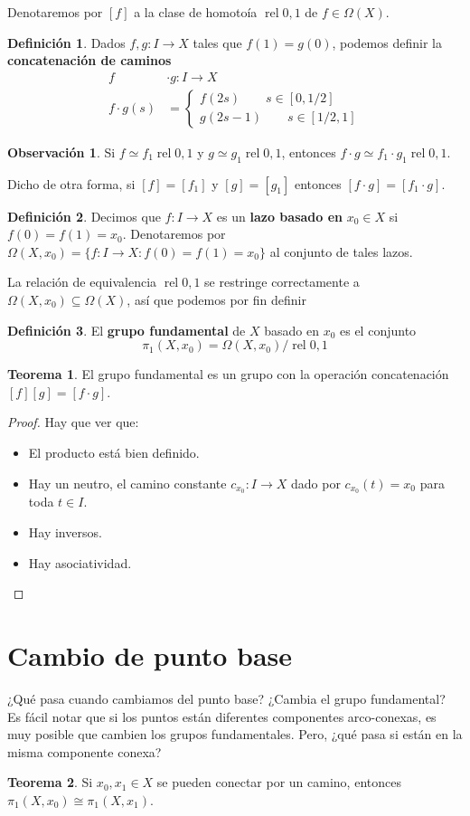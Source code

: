 \documentclass[spanish]{book}
\theoremstyle{definition}
\newtheorem*{defn}{Definición}
\newtheorem*{obs}{Observación}
\newtheorem*{teo}{Teorema}
\DeclareMathOperator{\rel}{rel}
\begin{document}
	Denotaremos por $[f]$ a la clase de homotoía $\rel0,1$ de $f\in\Omega(X)$.
	\begin{defn}
		Dados $f,g:I\to X$ tales que $f(1)=g(0)$, podemos definir la \textbf{concatenación de caminos}
		\begin{align*}
			f&\cdot g:I\to X\\
			f\cdot g(s)&=\begin{cases}
				f(2s)\qquad s\in[0,1/2]\\
				g(2s-1)\qquad s\in[1/2,1]
			\end{cases}
		\end{align*}
	\end{defn}
	\begin{obs}
		Si $f\simeq f_1\rel0,1$ y $g\simeq g_1\rel0,1$, entonces $f\cdot g\simeq f_1\cdot g_1\rel0,1$.
		
		Dicho de otra forma, si $[f]=[f_1]$ y $[g]=[g_1]$ entonces $[f\cdot g]=[f_1\cdot g]$.
	\end{obs}
	\begin{defn}
		Decimos que $f:I\to X$ es un \textbf{lazo basado en} $x_0\in X$ si $f(0)=f(1)=x_0$. Denotaremos por $\Omega(X,x_0)=\{f:I\to X:f(0)=f(1)=x_0\}$ al conjunto de tales lazos.
	\end{defn}
	La relación de equivalencia $\rel0,1$ se restringe correctamente a $\Omega(X,x_0)\subseteq\Omega(X)$, así que podemos por fin definir
	\begin{defn}
		El \textbf{grupo fundamental} de $X$ basado en $x_0$ es el conjunto
		\[\pi_1(X,x_0)=\Omega(X,x_0)/\rel0,1\]
	\end{defn}
	\begin{teo}
		El grupo fundamental es un grupo con la operación concatenación $[f][g]=[f\cdot g]$.
	\end{teo}
	\begin{proof}
		Hay que ver que:
		\begin{itemize}
			\item El producto está bien definido.
			\item Hay un neutro, el camino constante $c_{x_0}:I\to X$ dado por $c_{x_0}(t)=x_0$ para toda $t\in I$.
			\item Hay inversos.
			\item Hay asociatividad.
		\end{itemize}
	\end{proof}
\section{Cambio de punto base}
	¿Qué pasa cuando cambiamos del punto base? ¿Cambia el grupo fundamental? Es fácil notar que si los puntos están diferentes componentes arco-conexas, es muy posible que cambien los grupos fundamentales. Pero, ¿qué pasa si están en la misma componente conexa?
	\begin{teo}\label{teo:cambioptobase}
		Si $x_0,x_1\in X$ se pueden conectar por un camino, entonces $\pi_1(X,x_0)\cong\pi_1(X,x_1)$.
	\end{teo}
\end{document}

